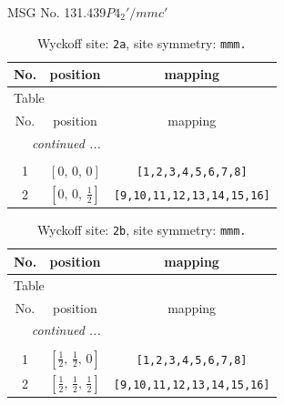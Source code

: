 \documentclass[fleqn,8pt]{jsarticle}
\begin{document}
\setcounter{MaxMatrixCols}{32}

\renewcommand{\tablename}{Table~}
\renewcommand{\figurename}{Figure~}
\begin{center}
\LARGE
MSG No. 131.439\quad$P4_{2}'/mmc'$
\end{center}
\renewcommand{\arraystretch}{1.2}
\begin{longtable}{ccc}
\caption{Wyckoff site: {\tt 2a}, site symmetry: {\tt mmm.}}
 \\
 \hline \hline
No. & position & mapping \\ \hline \endfirsthead

\multicolumn{2}{l}{\tablename\ \thetable{}} \\
 \hline \hline
No. & position & mapping \\ \hline \endhead

 \hline \hline
\multicolumn{2}{r}{\footnotesize\it continued ...} \\ \endfoot

 \hline \hline
\multicolumn{2}{r}{} \\ \endlastfoot

1 & $\left[ 0,\, 0,\, 0 \right]$ & {\tt [1,2,3,4,5,6,7,8]} \\ \hline
2 & $\left[ 0,\, 0,\, \frac{1}{2} \right]$ & {\tt [9,10,11,12,13,14,15,16]} \\
\end{longtable}
\renewcommand{\arraystretch}{1.2}
\begin{longtable}{ccc}
\caption{Wyckoff site: {\tt 2b}, site symmetry: {\tt mmm.}}
 \\
 \hline \hline
No. & position & mapping \\ \hline \endfirsthead

\multicolumn{2}{l}{\tablename\ \thetable{}} \\
 \hline \hline
No. & position & mapping \\ \hline \endhead

 \hline \hline
\multicolumn{2}{r}{\footnotesize\it continued ...} \\ \endfoot

 \hline \hline
\multicolumn{2}{r}{} \\ \endlastfoot

1 & $\left[ \frac{1}{2},\, \frac{1}{2},\, 0 \right]$ & {\tt [1,2,3,4,5,6,7,8]} \\ \hline
2 & $\left[ \frac{1}{2},\, \frac{1}{2},\, \frac{1}{2} \right]$ & {\tt [9,10,11,12,13,14,15,16]} \\
\end{longtable}
\end{document}
